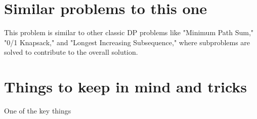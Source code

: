 \section*{Similar problems to this one}
This problem is similar to other classic DP problems like "Minimum Path Sum," "0/1 Knapsack," and "Longest Increasing Subsequence," where subproblems are solved to contribute to the overall solution.

\section*{Things to keep in mind and tricks}
One of the key things